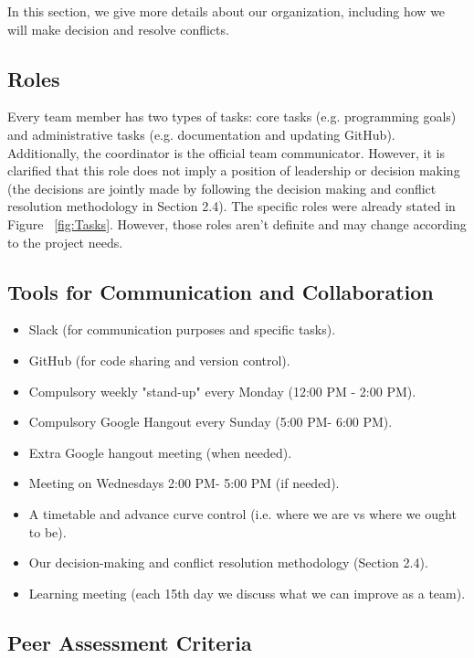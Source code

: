 In this section, we give more details about our organization, including how we will make decision and resolve conflicts. 

\subsection{Roles}

Every team member has two types of tasks: core tasks (e.g. programming goals) and administrative tasks (e.g. documentation and updating GitHub). Additionally, the coordinator is the official team communicator. However, it is clarified that this role does not imply a position of leadership or decision making (the decisions are jointly made by following the decision making and conflict resolution methodology in Section 2.4). The specific roles were already stated in Figure ~\ref{fig:Tasks}. However, those roles aren't definite and may change according to the project needs.

\subsection{Tools for Communication and Collaboration}

\begin{itemize}
	\item Slack (for communication purposes and specific tasks).
	\item GitHub (for code sharing and version control).
	\item Compulsory weekly "stand-up" every Monday (12:00 PM - 2:00 PM).
	\item Compulsory Google Hangout every Sunday (5:00 PM- 6:00 PM).
	\item Extra Google hangout meeting (when needed).
	\item Meeting on Wednesdays 2:00 PM- 5:00 PM (if needed). 
	\item A timetable and advance curve control (i.e. where we are vs where we ought to be).
	\item Our decision-making and conflict resolution methodology (Section 2.4).
	\item Learning meeting (each 15th day we discuss what we can improve as a team).
\end{itemize}




\subsection{Peer Assessment Criteria}

